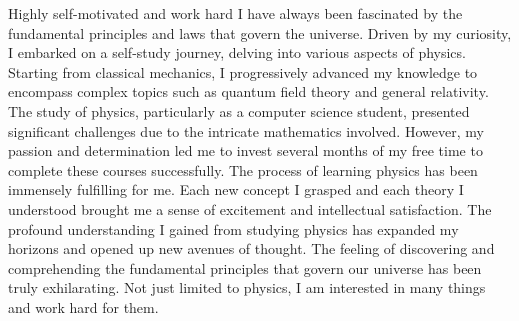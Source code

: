 
\begin{cventries}

	\cventry
	{} %
	{Highly self-motivated and work hard} %
	{\hfill} %
	{} %
	{
		\quad I have always been fascinated by the fundamental principles and laws that govern the universe. Driven by my curiosity, I embarked on a self-study journey, delving into various aspects of physics. Starting from classical mechanics, I progressively advanced my knowledge to encompass complex topics such as quantum field theory and general relativity. The study of physics, particularly as a computer science student, presented significant challenges due to the intricate mathematics involved. However, my passion and determination led me to invest several months of my free time to complete these courses successfully. \newline
		\quad The process of learning physics has been immensely fulfilling for me. Each new concept I grasped and each theory I understood brought me a sense of excitement and intellectual satisfaction. The profound understanding I gained from studying physics has expanded my horizons and opened up new avenues of thought. The feeling of discovering and comprehending the fundamental principles that govern our universe has been truly exhilarating. \newline
		\quad Not just limited to physics, I am interested in many things and work hard for them. \newline
	}
\end{cventries}
